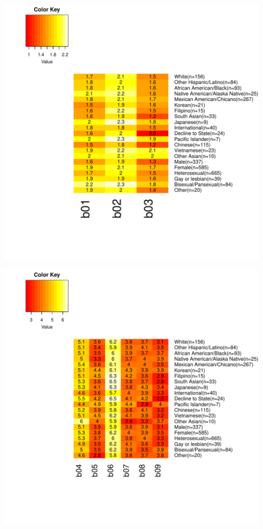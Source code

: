 \documentclass{article}\usepackage[]{graphicx}\usepackage[]{color}
\makeatletter
\def\maxwidth{ %
  \ifdim\Gin@nat@width>\linewidth
    \linewidth
  \else
    \Gin@nat@width
  \fi
}
\makeatother
\begin{document}
\includegraphics[width=\maxwidth]{figure/unnamed-chunk-18-3} \hfill{}




\includegraphics[width=\maxwidth]{figure/unnamed-chunk-18-4} \hfill{}
\end{document}
